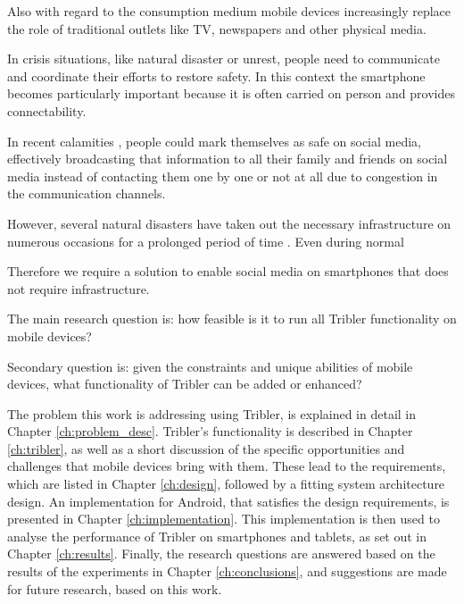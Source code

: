 Also with regard to the consumption medium mobile devices increasingly replace the role of traditional outlets like TV, newspapers and other physical media.

In crisis situations, like natural disaster or unrest, people need to communicate and coordinate their efforts to restore safety.
In this context the smartphone becomes particularly important because it is often carried on person and provides connectability.

In recent calamities \cite{earthquake-nepal, etc...}, people could mark themselves as safe on social media, effectively broadcasting that information to all their family and friends on social media instead of contacting them one by one or not at all due to congestion in the communication channels.

However, several natural disasters have taken out the necessary infrastructure on numerous occasions for a prolonged period of time \cite{renesys2005katrina}.
Even during normal 

Therefore we require a solution to enable social media on smartphones that does not require infrastructure. %




The main research question is: how feasible is it to run all Tribler functionality on mobile devices? %

Secondary question is: given the constraints and unique abilities of mobile devices, what functionality of Tribler can be added or enhanced?






The problem this work is addressing using Tribler, is explained in detail in Chapter \ref{ch:problem_desc}.
Tribler's functionality is described in Chapter \ref{ch:tribler}, as well as a short discussion of the specific opportunities and challenges that mobile devices bring with them.
These lead to the requirements, which are listed in Chapter \ref{ch:design}, followed by a fitting system architecture design.
An implementation for Android, that satisfies the design requirements, is presented in Chapter \ref{ch:implementation}.
This implementation is then used to analyse the performance of Tribler on smartphones and tablets, as set out in Chapter \ref{ch:results}.
Finally, the research questions are answered based on the results of the experiments in Chapter \ref{ch:conclusions}, and suggestions are made for future research, based on this work.

